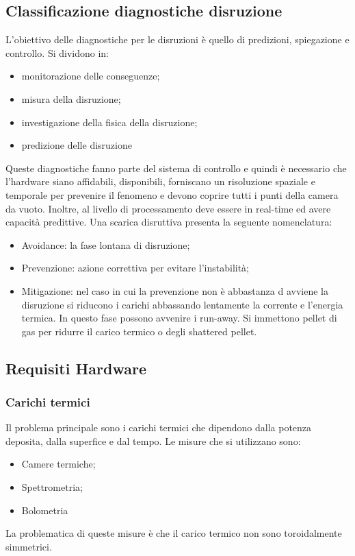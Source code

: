 \documentclass{article}
\begin{document}
\subsection{Classificazione diagnostiche disruzione}
L'obiettivo delle diagnostiche per le disruzioni è quello di predizioni, spiegazione e controllo. Si dividono in:
\begin{itemize}
    \item monitorazione delle conseguenze;
    \item misura della disruzione;
    \item investigazione della fisica della disruzione;
    \item predizione delle disruzione
\end{itemize}
Queste diagnostiche fanno parte del sistema di controllo e quindi è necessario che l'hardware siano affidabili, disponibili, forniscano un risoluzione spaziale e temporale per prevenire il fenomeno e devono coprire tutti i punti della camera da vuoto. Inoltre, al livello di processamento deve essere in real-time ed avere capacità predittive.
Una scarica disruttiva presenta la seguente nomenclatura:
\begin{itemize}
    \item Avoidance: la fase lontana di disruzione;
    \item Prevenzione: azione correttiva per evitare l'instabilità;
    \item Mitigazione: nel caso in cui la prevenzione non è abbastanza d avviene la disruzione si riducono i carichi abbassando lentamente la corrente e l'energia termica. In questo fase possono avvenire i run-away. Si immettono pellet di gas per ridurre il carico termico o degli shattered pellet.
\end{itemize}
\subsection{Requisiti Hardware}
\subsubsection{Carichi termici}
Il problema principale sono i carichi termici che dipendono dalla potenza deposita, dalla superfice e dal tempo. Le misure che si utilizzano sono:\begin{itemize}
    \item Camere termiche;
    \item Spettrometria;
    \item Bolometria
\end{itemize}
La problematica di queste misure è che il carico termico non sono toroidalmente simmetrici.
\end{document}
